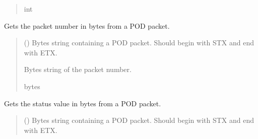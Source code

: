 \documentclass[letterpaper,10pt,english]{sphinxmanual}
\begin{document}
\begin{fulllineitems}
\begin{fulllineitems}
\begin{quote}
\begin{description}
\sphinxAtStartPar
int

\end{description}\end{quote}

\end{fulllineitems}


\begin{fulllineitems}
\label{\detokenize{PodApi.Packets:PodApi.Packets.Binary5.PacketBinary5.GetPacketNumber}}
\pysigstartsignatures
{}
\pysigstopsignatures
\sphinxAtStartPar
Gets the packet number in bytes from a POD packet.
\begin{quote}\begin{description}
\sphinxAtStartPar
{} () \textendash{} Bytes string containing a POD packet. Should begin with STX and                 end with ETX.

\sphinxAtStartPar
Bytes string of the packet number.

\sphinxAtStartPar
bytes

\end{description}\end{quote}

\end{fulllineitems}


\begin{fulllineitems}
\label{\detokenize{PodApi.Packets:PodApi.Packets.Binary5.PacketBinary5.GetStatus}}
\pysigstartsignatures
{}
\pysigstopsignatures
\sphinxAtStartPar
Gets the status value in bytes from a POD packet.
\begin{quote}\begin{description}
\sphinxAtStartPar
{} () \textendash{} Bytes string containing a POD packet. Should begin with STX and                 end with ETX.


\end{description}
\end{quote}
\end{fulllineitems}
\end{fulllineitems}
\end{document}
